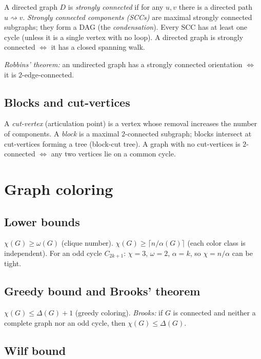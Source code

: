 A directed graph $D$ is \textit{strongly connected} if for any $u,v$ there is a directed path $u\rightsquigarrow v$. \textit{Strongly connected components (SCCs)} are maximal strongly connected subgraphs; they form a DAG (the \textit{condensation}). Every SCC has at least one cycle (unless it is a single vertex with no loop). A directed graph is strongly connected $\iff$ it has a closed spanning walk.

\textit{Robbins' theorem:} an undirected graph has a strongly connected orientation $\iff$ it is $2$-edge-connected.

\subsection{Blocks and cut-vertices}
\label{subsec:blocks}

A \textit{cut-vertex} (articulation point) is a vertex whose removal increases the number of components. A \textit{block} is a maximal $2$-connected subgraph; blocks intersect at cut-vertices forming a tree (block-cut tree). A graph with no cut-vertices is $2$-connected $\iff$ any two vertices lie on a common cycle.

\medskip

\section{Graph coloring}
\label{sec:coloring}

\subsection{Lower bounds}
\label{subsec:coloring-lower}

$\chi(G)\ge\omega(G)$ (clique number). $\chi(G)\ge\lceil n/\alpha(G)\rceil$ (each color class is independent). For an odd cycle $C_{2k+1}$: $\chi=3$, $\omega=2$, $\alpha=k$, so $\chi=n/\alpha$ can be tight.

\subsection{Greedy bound and Brooks' theorem}
\label{subsec:greedy-coloring}

$\chi(G)\le\Delta(G)+1$ (greedy coloring). \textit{Brooks:} if $G$ is connected and neither a complete graph nor an odd cycle, then $\chi(G)\le\Delta(G)$.

\subsection{Wilf bound}
\label{subsec:wilf}


